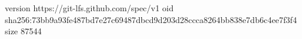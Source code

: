 version https://git-lfs.github.com/spec/v1
oid sha256:73bb9a93fe487bd7e27c69487dbcd9d203d28ccca8264bb838e7db6c4ee7f3f4
size 87544
